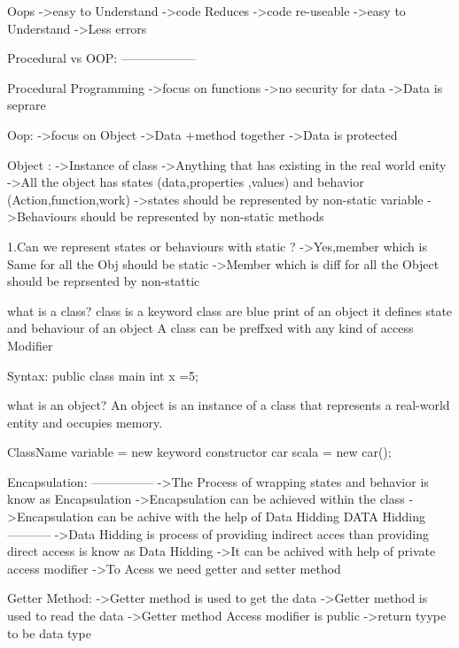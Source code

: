 Oops
   ->easy to Understand
   ->code Reduces
   ->code re-useable
   ->easy to Understand
   ->Less errors


Procedural vs OOP:
------------------
                  
                Procedural Programming
                ->focus on functions
                ->no security for data
                ->Data is seprare

                Oop:
                ->focus on Object
                ->Data +method together
                ->Data is protected




Object :
     ->Instance of class
     ->Anything that has existing in the real world enity
     ->All the object has states (data,properties ,values) and behavior (Action,function,work)
     ->states should be represented by non-static variable
     ->Behaviours should be represented by non-static methods

      1.Can we represent states or behaviours with static ?
      ->Yes,member which is Same for all the Obj should be static
      ->Member which is diff for all the Object should be reprsented by non-stattic

what is a class?
            class is a keyword
            class are blue print of an object
            it defines state and behaviour of an object
            A class can be preffxed with any kind of access Modifier



            Syntax: 
                  public class main{
                     int x =5;
                  }


what is an object?
           An object is an instance of a class that represents a real-world entity and occupies memory.

           ClassName variable = new keyword constructor
           car scala = new car();


Encapsulation:
---------------
            ->The Process of wrapping states and behavior is know as Encapsulation
            ->Encapsulation can be achieved within the class
            ->Encapsulation can be achive with the help of Data Hidding
      DATA Hidding
      -----------
               ->Data Hidding is process of providing indirect acces than providing direct access is know as Data Hidding
               ->It can be achived with help of private access modifier
               ->To Acess we need getter and setter method
      
      Getter Method:
               ->Getter method is used to get the data
               ->Getter method is used to read the data
               ->Getter method Access modifier is public
               ->return tyype to be data type

